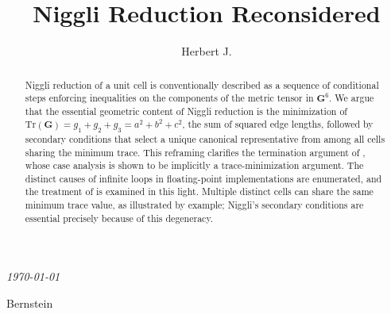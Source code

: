 \documentclass[preprint]{iucr}              %
\numberwithin{equation}{section}
\newcommand{\GVI}{\ensuremath{\mathbf{G}^{6}}}
\begin{document}
	
	
	\begin{center}
		{\LARGE \emph{\today}} \\
	\end{center}
	
	\title{Niggli Reduction Reconsidered}
	
	\author[a]{Herbert J.}{Bernstein}
	
	
	
	\keyword{\GVI}
	
	\maketitle                        %
	
	
	\begin{abstract}
		Niggli reduction of a unit cell is conventionally described as a
		sequence of conditional steps enforcing inequalities on the components
		of the metric tensor in \GVI{}. We argue that the essential geometric
		content of Niggli reduction is the minimization of
		$\mathrm{Tr}(\mathbf{G}) = g_1 + g_2 + g_3 = a^2 + b^2 + c^2$,
		the sum of squared edge lengths, followed by secondary conditions that
		select a unique canonical representative from among all cells sharing
		the minimum trace. This reframing clarifies the termination argument
		of , whose case analysis is shown to be
		implicitly a trace-minimization argument. The distinct causes of
		infinite loops in floating-point implementations are enumerated, and
		the treatment of  is examined in
		this light. Multiple distinct cells can share the same minimum trace
		value, as illustrated by example; Niggli's secondary conditions are
		essential precisely because of this degeneracy.
	\end{abstract}
	
\end{document}
